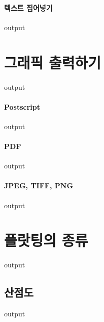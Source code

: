 \documentclass{book}
\begin{document}
\paragraph{텍스트 집어넣기}
\begin{Schunk}
\begin{Soutput}
output
\end{Soutput}
\end{Schunk}

\section{그래픽 출력하기}
\begin{Schunk}
\begin{Soutput}
output
\end{Soutput}
\end{Schunk}
\paragraph{Postscript}
\begin{Schunk}
\begin{Soutput}
output
\end{Soutput}
\end{Schunk}
\paragraph{PDF}
\begin{Schunk}
\begin{Soutput}
output
\end{Soutput}
\end{Schunk}
\paragraph{JPEG, TIFF, PNG}
\begin{Schunk}
\begin{Soutput}
output
\end{Soutput}
\end{Schunk}

\section{플랏팅의 종류}
\begin{Schunk}
\begin{Soutput}
output
\end{Soutput}
\end{Schunk}

\subsection{산점도}
\begin{Schunk}
\begin{Soutput}
output
\end{Soutput}
\end{Schunk}
\end{document}
